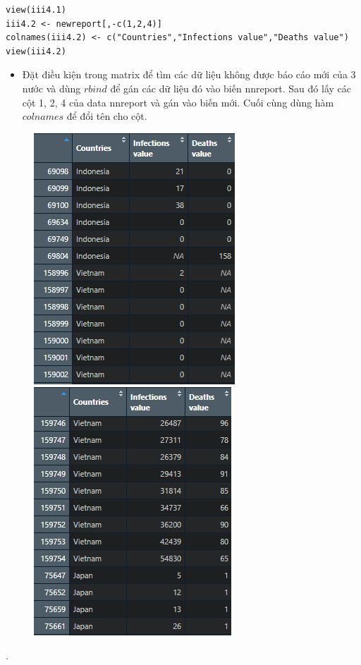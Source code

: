 \documentclass[a4paper]{article}
\theoremstyle{definition}
\begin{document}
\begin{enumerate}[i)]
\begin{enumerate}[1)]
\begin{lstlisting}[frame=single]
view(iii4.1)
iii4.2 <- newreport[,-c(1,2,4)]
colnames(iii4.2) <- c("Countries","Infections value","Deaths value")
view(iii4.2)
	\end{lstlisting}
	\begin{itemize}
	    \item Đặt điều kiện trong matrix để tìm các dữ liệu không được báo cáo mới của 3 nước và dùng $rbind$ để gán các dữ liệu đó vào biến nnreport. Sau đó lấy các cột 1, 2, 4 của data nnreport và gán vào biến mới. Cuối cùng dùng hàm $colnames$ để đổi tên cho cột.
	\end{itemize}
	\begin{figure}[h!]
		\begin{center}
		    \includegraphics[scale=0.65]{Images/III/iii4.1.png}
		    \includegraphics[scale=0.65]{Images/III/iii4.2.png}
		\end{center}
	\end{figure}.
	

\end{enumerate}
\end{enumerate}
\end{document}
